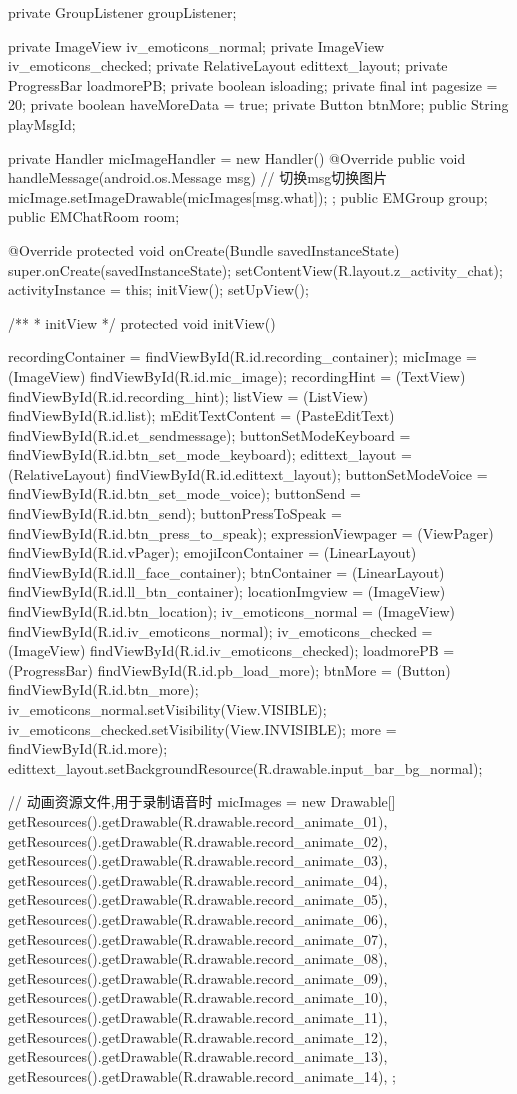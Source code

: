 {	private GroupListener groupListener;

	private ImageView iv_emoticons_normal;
	private ImageView iv_emoticons_checked;
	private RelativeLayout edittext_layout;
	private ProgressBar loadmorePB;
	private boolean isloading;
	private final int pagesize = 20;
	private boolean haveMoreData = true;
	private Button btnMore;
	public String playMsgId;

	private Handler micImageHandler = new Handler() {
		@Override
		public void handleMessage(android.os.Message msg) {
			// 切换msg切换图片
			micImage.setImageDrawable(micImages[msg.what]);
		}
	};
	public EMGroup group;
	public EMChatRoom room;

	@Override
	protected void onCreate(Bundle savedInstanceState) {
		super.onCreate(savedInstanceState);
		setContentView(R.layout.z_activity_chat);
		activityInstance = this;
		initView();
		setUpView();
	}

	/**
	 * initView
	 */
	protected void initView() {
		recordingContainer = findViewById(R.id.recording_container);
		micImage = (ImageView) findViewById(R.id.mic_image);
		recordingHint = (TextView) findViewById(R.id.recording_hint);
		listView = (ListView) findViewById(R.id.list);
		mEditTextContent = (PasteEditText) findViewById(R.id.et_sendmessage);
		buttonSetModeKeyboard = findViewById(R.id.btn_set_mode_keyboard);
		edittext_layout = (RelativeLayout) findViewById(R.id.edittext_layout);
		buttonSetModeVoice = findViewById(R.id.btn_set_mode_voice);
		buttonSend = findViewById(R.id.btn_send);
		buttonPressToSpeak = findViewById(R.id.btn_press_to_speak);
		expressionViewpager = (ViewPager) findViewById(R.id.vPager);
		emojiIconContainer = (LinearLayout) findViewById(R.id.ll_face_container);
		btnContainer = (LinearLayout) findViewById(R.id.ll_btn_container);
		locationImgview = (ImageView) findViewById(R.id.btn_location);
		iv_emoticons_normal = (ImageView) findViewById(R.id.iv_emoticons_normal);
		iv_emoticons_checked = (ImageView) findViewById(R.id.iv_emoticons_checked);
		loadmorePB = (ProgressBar) findViewById(R.id.pb_load_more);
		btnMore = (Button) findViewById(R.id.btn_more);
		iv_emoticons_normal.setVisibility(View.VISIBLE);
		iv_emoticons_checked.setVisibility(View.INVISIBLE);
		more = findViewById(R.id.more);
		edittext_layout.setBackgroundResource(R.drawable.input_bar_bg_normal);

		// 动画资源文件,用于录制语音时
		micImages = new Drawable[] { getResources().getDrawable(R.drawable.record_animate_01),
				getResources().getDrawable(R.drawable.record_animate_02),
				getResources().getDrawable(R.drawable.record_animate_03),
				getResources().getDrawable(R.drawable.record_animate_04),
				getResources().getDrawable(R.drawable.record_animate_05),
				getResources().getDrawable(R.drawable.record_animate_06),
				getResources().getDrawable(R.drawable.record_animate_07),
				getResources().getDrawable(R.drawable.record_animate_08),
				getResources().getDrawable(R.drawable.record_animate_09),
				getResources().getDrawable(R.drawable.record_animate_10),
				getResources().getDrawable(R.drawable.record_animate_11),
				getResources().getDrawable(R.drawable.record_animate_12),
				getResources().getDrawable(R.drawable.record_animate_13),
				getResources().getDrawable(R.drawable.record_animate_14), };

}}
